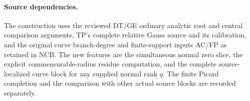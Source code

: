 \paragraph{Source dependencies.}
The construction uses the reviewed DT/GE ordinary analytic root
and central comparison arguments, TP's complete relative Gauss
source and its calibration, and the original curve branch-degree
and finite-support inputs AC/FP as retained in NCB.  The new
features are the simultaneous normal zero slice, the explicit
commensurable-radius residue computation, and the complete
source-localized curve block for any supplied normal rank \(q\).
The finite Picard completion and the comparison with other actual
source blocks are recorded separately.

